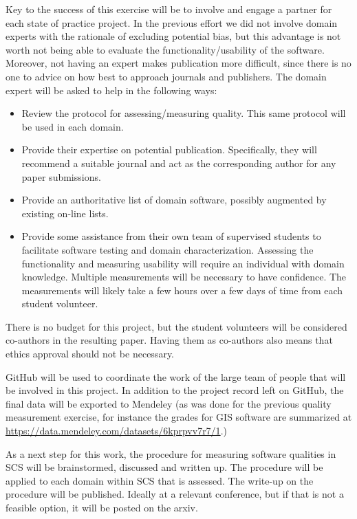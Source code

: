 \documentclass[12pt]{article}
\begin{document}
Key to the success of this exercise will be to involve and engage a partner for
each state of practice project.  In the previous effort we did not involve domain
experts with the rationale of excluding potential bias, but this advantage is
not worth not being able to evaluate the functionality/usability of the software.
Moreover, not having an expert makes publication more difficult, since there is
no one to advice on how best to approach journals and publishers.  The domain
expert will be asked to help in the following ways:

\begin{itemize}
\item Review the protocol for assessing/measuring quality.  This same protocol
  will be used in each domain.
\item Provide their expertise on potential publication.  Specifically, they will
  recommend a suitable journal and act as the corresponding author for any paper
  submissions. 
\item Provide an authoritative list of domain software, possibly augmented by
  existing on-line lists.
\item Provide some assistance from their own team of supervised students to
  facilitate software testing and domain characterization.  Assessing the
  functionality and measuring usability will require an individual with domain
  knowledge.  Multiple measurements will be necessary to have confidence.  The
  measurements will likely take a few hours over a few days of time from each
  student volunteer.
\end{itemize}

There is no budget for this project, but the student volunteers will be
considered co-authors in the resulting paper.  Having them as co-authors also
means that ethics approval should not be necessary.

GitHub will be used to coordinate the work of the large team of people that will
be involved in this project.  In addition to the project record left on GitHub,
the final data will be exported to Mendeley (as was done for the previous
quality measurement exercise, for instance the grades for GIS software are
summarized at \href{https://data.mendeley.com/datasets/6kprpvv7r7/1}
{https://data.mendeley.com/datasets/6kprpvv7r7/1}.)

As a next step for this work, the procedure for measuring software qualities in
SCS will be brainstormed, discussed and written up.  The procedure will be
applied to each domain within SCS that is assessed.  The write-up on the procedure
will be published.  Ideally at a relevant conference, but if that is not a
feasible option, it will be posted on the arxiv.
\end{document}

